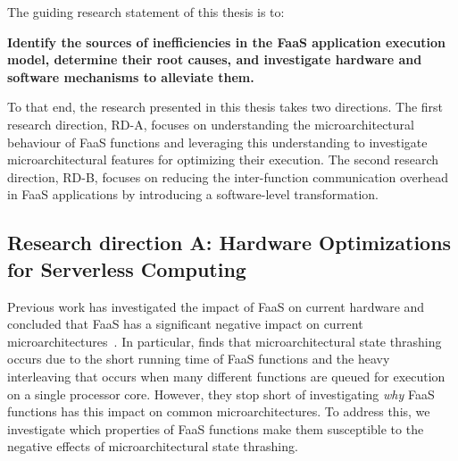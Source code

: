 \documentclass[../main.tex]{subfiles}
\begin{document}
\begin{refsection}
The guiding research statement of this thesis is to:
\begin{framed}
\noindent
\textbf{Identify the sources of inefficiencies in the FaaS application execution model, determine their root causes, and investigate hardware and software mechanisms to alleviate them.}
\end{framed}
\noindent
To that end, the research presented in this thesis takes two
directions. The first research direction, RD-A, focuses on
understanding the microarchitectural behaviour of FaaS functions and
leveraging this understanding to investigate microarchitectural
features for optimizing their execution.
The second research direction, RD-B, focuses on reducing the
inter-function communication overhead in FaaS applications by
introducing a software-level transformation.


\subsection{Research direction A: Hardware Optimizations for Serverless Computing}
\label{sec:rda}

Previous work has investigated the
impact of FaaS on current hardware and concluded that FaaS has a
significant negative impact on current
microarchitectures~\cite{shahrad19_archit_implic_funct_servic_comput,lukewarm_serverless}. In
particular, \textcite{lukewarm_serverless} finds that
microarchitectural state thrashing occurs due to the short running
time of FaaS functions and the heavy interleaving that occurs when many
different functions are queued for execution on a single processor core. However, they stop short of investigating \emph{why} FaaS
functions has this impact on common microarchitectures. To address this, we investigate which properties of FaaS functions
make them susceptible to the negative effects of microarchitectural
state thrashing.


\end{refsection}
\end{document}

